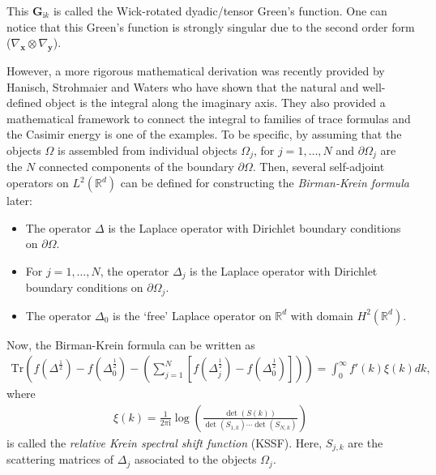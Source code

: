 This $ \boldsymbol{G}_{\mathrm{i}k}$ is called the Wick-rotated dyadic/tensor Green's function. One can notice that this Green's function is strongly singular 
due to the second order form ($\nabla_{\boldsymbol{x}}\otimes\nabla_{\boldsymbol{y}}$). 



However, a more rigorous mathematical 
derivation was recently provided by Hanisch, Strohmaier and Waters \cite{hanisch2020relative} who have shown that the natural and well-defined object is the 
integral along the imaginary axis. They also provided a mathematical framework to connect the integral to families of trace formulas and the Casimir 
energy is one of the examples. To be specific, by assuming that the objects $\Omega$ is assembled from individual objects $\Omega_{j}$, for $j = 1, \dots, N$ and 
$\partial\Omega_{j}$ are the $N$ connected components of the boundary $\partial\Omega$. Then, several self-adjoint operators on $L^{2}(\mathbb{R}^{d})$
can be defined for constructing the \emph{Birman-Krein formula} later:
\begin{itemize}
    \item The operator $\Delta$ is the Laplace operator with Dirichlet boundary conditions on $\partial\Omega$.
    \item For $j = 1, \dots, N$, the operator $\Delta_{j}$ is the Laplace operator with Dirichlet boundary conditions on $\partial\Omega_{j}$.
    \item The operator $\Delta_{0}$ is the `free' Laplace operator on $\mathbb{R}^{d}$ with domain $H^{2}(\mathbb{R}^{d})$.
\end{itemize}

Now, the Birman-Krein formula can be written as 
\begin{align}\label{B-K formula}
    \text{Tr}\left(f(\Delta^{\frac{1}{2}}) - f(\Delta_{0}^{\frac{1}{2}}) - \left(\sum_{j = 1}^{N}[f(\Delta_{j}^{\frac{1}{2}}) - f(\Delta_{0}^{\frac{1}{2}})]\right)\right)  = \int_{0}^{\infty}f'(k)\xi(k)dk,
\end{align}
where 
\begin{align*}
    \xi(k) = \frac{1}{2\pi \mathrm{i}}\log\left(\frac{\det(S(k))}{\det(S_{1,k})\cdots\det(S_{N,k})}\right)
\end{align*}
is called the \emph{relative Krein spectral shift function} (KSSF). Here, $S_{j,k}$ are the scattering matrices of $\Delta_{j}$ associated to the objects $\Omega_{j}$.

